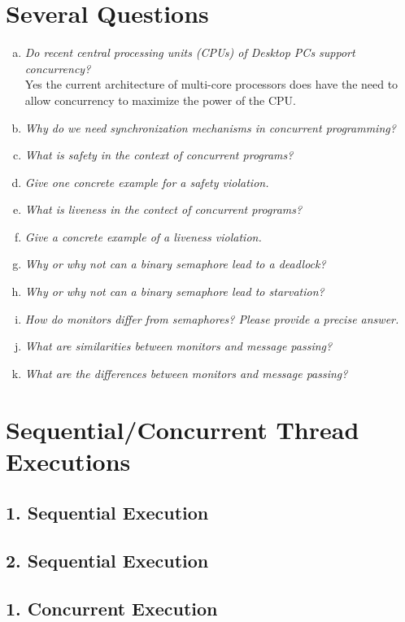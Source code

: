 \documentclass{report}
\begin{document}
	\section{Several Questions}
	\startsection
		\begin{enumerate}[a)]
			\item \textit{Do recent central processing units (CPUs) of Desktop PCs support concurrency?} \\
			Yes the current architecture of multi-core processors does have the need to allow concurrency to maximize the power of the CPU.
			\item \textit{Why do we need synchronization mechanisms in concurrent programming?}
			\item \textit{What is safety in the context of concurrent programs?}
			\item \textit{Give one concrete example for a safety violation.}
			\item \textit{What is liveness in the contect of concurrent programs?}
			\item \textit{Give a concrete example of a liveness violation.}
			\item \textit{Why or why not can a binary semaphore lead to a deadlock?}
			\item \textit{Why or why not can a binary semaphore lead to starvation?}
			\item \textit{How do monitors differ from semaphores? Please provide a precise answer.}
			\item \textit{What are similarities between monitors and message passing?}
			\item \textit{What are the differences between monitors and message passing?}
		\end{enumerate}
	\closesection
	\section{Sequential/Concurrent Thread Executions}
	\startsection
		\subsection{1. Sequential Execution}
		\startsubsection
		\closesection
		\subsection{2. Sequential Execution}
		\startsubsection
		\closesection
		\subsection{1. Concurrent Execution}
		\startsubsection
		\closesection
\end{document}
